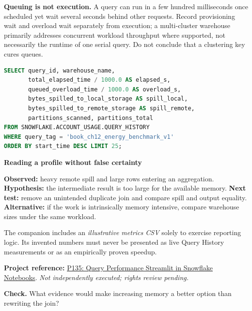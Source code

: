 \documentclass[11pt,twoside]{article}
\newcommand{\repo}[2]{\par\begingroup\fontsize{8.0}{9.6}\selectfont\sffamily\color{inkgray}\textbf{Project reference:} \href{#2}{#1}. \textit{Not independently executed; rights review pending.}\par\endgroup}
\begin{document}
\textbf{Queuing is not execution.} A query can run in a few hundred milliseconds once scheduled yet wait several seconds behind other requests. Record provisioning wait and overload wait separately from execution; a multi-cluster warehouse primarily addresses concurrent workload throughput where supported, not necessarily the runtime of one serial query. Do not conclude that a clustering key cures queues.
\begin{lstlisting}[language=SQL,caption={Historical diagnostic fields; requires monitoring privileges.}]
SELECT query_id, warehouse_name,
       total_elapsed_time / 1000.0 AS elapsed_s,
       queued_overload_time / 1000.0 AS overload_s,
       bytes_spilled_to_local_storage AS spill_local,
       bytes_spilled_to_remote_storage AS spill_remote,
       partitions_scanned, partitions_total
FROM SNOWFLAKE.ACCOUNT_USAGE.QUERY_HISTORY
WHERE query_tag = 'book_ch12_energy_benchmark_v1'
ORDER BY start_time DESC LIMIT 25;
\end{lstlisting}
\begin{whitebox}\textbf{Reading a profile without false certainty}\par
\textbf{Observed:} heavy remote spill and large rows entering an aggregation. \textbf{Hypothesis:} the intermediate result is too large for the available memory. \textbf{Next test:} remove an unintended duplicate join and compare spill and output equality. \textbf{Alternative:} if the work is intrinsically memory intensive, compare warehouse sizes under the same workload.\end{whitebox}
The companion includes an \emph{illustrative metrics CSV} solely to exercise reporting logic. Its invented numbers must never be presented as live Query History measurements or as an empirically proven speedup.
\repo{P135: Query Performance Streamlit in Snowflake Notebooks}{https://github.com/deept-agl/Query-Performance-Streamlit-App-in-Snowflake-Notebooks}
\textbf{Check.} What evidence would make increasing memory a better option than rewriting the join?
\newpage
\end{document}

